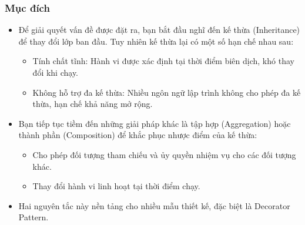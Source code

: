 \subsubsection{Mục đích}
\begin{itemize}
    \item Để giải quyết vấn đề được đặt ra, bạn bắt đầu nghĩ đến kế thừa (Inheritance) để thay đổi lớp ban đầu. Tuy nhiên kế thừa lại có một số hạn chế nhau sau:
    \begin{itemize}
        \item Tính chất tĩnh: Hành vi được xác định tại thời điểm biên dịch, khó thay đổi khi chạy.
        \item Không hỗ trợ đa kế thừa: Nhiều ngôn ngữ lập trình không cho phép đa kế thừa, hạn chế khả năng mở rộng.
    \end{itemize}
    
    \item Bạn tiếp tục tiềm đến những giải pháp khác là tập hợp (Aggregation) hoặc thành phần (Composition) để khắc phục nhược điểm của kế thừa: 
    \begin{itemize}
        \item Cho phép đối tượng tham chiếu và ủy quyền nhiệm vụ cho các đối tượng khác.
        \item Thay đổi hành vi linh hoạt tại thời điểm chạy.
    \end{itemize}

    \item Hai nguyên tắc này nền tảng cho nhiều mẫu thiết kế, đặc biệt là Decorator Pattern.
\end{itemize}

